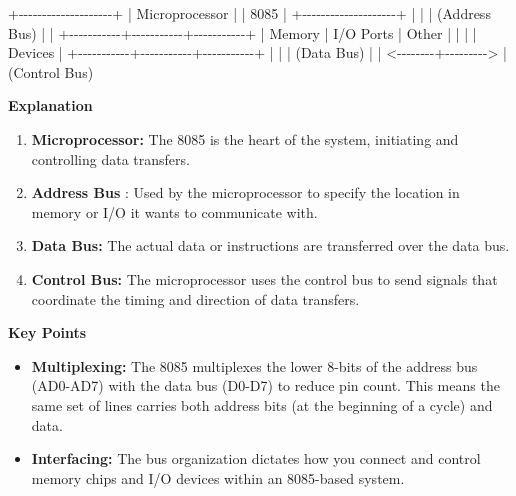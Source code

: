 \documentclass[
]{article}
\newenvironment{Shaded}{}{}
\newcommand{\NormalTok}[1]{#1}
\begin{document}
\begin{Shaded}
\begin{Highlighting}[]
\NormalTok{        +{-}{-}{-}{-}{-}{-}{-}{-}{-}{-}{-}{-}{-}{-}{-}{-}{-}{-}{-}{-}+}
\NormalTok{        |    Microprocessor  |}
\NormalTok{        |       8085         |}
\NormalTok{        +{-}{-}{-}{-}{-}{-}{-}{-}{-}{-}{-}{-}{-}{-}{-}{-}{-}{-}{-}{-}+}
\NormalTok{               |       |}
\NormalTok{               | (Address Bus)}
\NormalTok{               |       |}
\NormalTok{   +{-}{-}{-}{-}{-}{-}{-}{-}{-}{-}{-}+{-}{-}{-}{-}{-}{-}{-}{-}{-}{-}{-}+{-}{-}{-}{-}{-}{-}{-}{-}{-}{-}{-}+}
\NormalTok{   | Memory    | I/O Ports | Other     |}
\NormalTok{   |           |           | Devices   |}
\NormalTok{   +{-}{-}{-}{-}{-}{-}{-}{-}{-}{-}{-}+{-}{-}{-}{-}{-}{-}{-}{-}{-}{-}{-}+{-}{-}{-}{-}{-}{-}{-}{-}{-}{-}{-}+}
\NormalTok{               |       |}
\NormalTok{               | (Data Bus)}
\NormalTok{               |       |}
\NormalTok{      \textless{}{-}{-}{-}{-}{-}{-}{-}{-}+{-}{-}{-}{-}{-}{-}{-}{-}{-}\textgreater{}}
\NormalTok{               | (Control Bus)}
\end{Highlighting}
\end{Shaded}

\textbf{Explanation}

\begin{enumerate}
\def\labelenumi{\arabic{enumi}.}
\item
  \textbf{Microprocessor:} The 8085 is the heart of the system,
  initiating and controlling data transfers.
\item
  \textbf{Address Bus} : Used by the microprocessor to specify the
  location in memory or I/O it wants to communicate with.
\item
  \textbf{Data Bus:} The actual data or instructions are transferred
  over the data bus.
\item
  \textbf{Control Bus:} The microprocessor uses the control bus to send
  signals that coordinate the timing and direction of data transfers.
\end{enumerate}

\textbf{Key Points}

\begin{itemize}
\item
  \textbf{Multiplexing:} The 8085 multiplexes the lower 8-bits of the
  address bus (AD0-AD7) with the data bus (D0-D7) to reduce pin count.
  This means the same set of lines carries both address bits (at the
  beginning of a cycle) and data.
\item
  \textbf{Interfacing:} The bus organization dictates how you connect
  and control memory chips and I/O devices within an 8085-based system.
\end{itemize}
\end{document}
